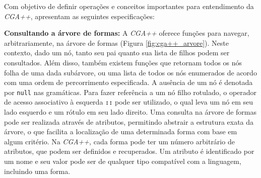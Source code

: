 \begin{figure}[h!]
	\centering
	\captionsetup{width=15cm}
	{}	
\end{figure}

\newpage

Com objetivo de definir operações e conceitos importantes para entendimento da \textit{CGA++},  apresentam as seguintes especificações:

\textbf{Consultando a árvore de formas:} A \textit{CGA++} oferece funções para navegar, arbitrariamente, na árvore de formas (Figura \ref{fig:cga++_arvore}). Neste contexto, dado um nó, tanto seu pai quanto sua lista de filhos podem ser consultados. Além disso, também existem funções que retornam todos os nós folha de uma dada subárvore, ou uma lista de todos os nós enumerados de acordo com uma ordem de percorrimento especificada. A ausência de um nó é denotada por \texttt{null} nas gramáticas. Para fazer referência a um nó filho rotulado, o operador de acesso associativo à esquerda \textbf{\texttt{::}} pode ser utilizado, o qual leva um nó em seu lado esquerdo e um rótulo em seu lado direito. Uma consulta na árvore de formas pode ser realizada através de atributos, permitindo abstrair a estrutura exata da árvore, o que facilita a localização de uma determinada forma com base em algum critério. Na \textit{CGA++}, cada forma pode ter um número arbitrário de atributos, que podem ser definidos e recuperados. Um atributo é identificado por um nome e seu valor pode ser de qualquer tipo compatível com a linguagem, incluindo uma forma.

